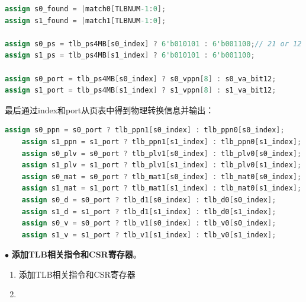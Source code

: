 \documentclass[11pt]{article}
\begin{document}
\begin{enumerate}
\begin{lstlisting}[language=verilog]
assign s0_found = |match0[TLBNUM-1:0];
assign s1_found = |match1[TLBNUM-1:0];

assign s0_ps = tlb_ps4MB[s0_index] ? 6'b010101 : 6'b001100;// 21 or 12 
assign s1_ps = tlb_ps4MB[s1_index] ? 6'b010101 : 6'b001100;

assign s0_port = tlb_ps4MB[s0_index] ? s0_vppn[8] : s0_va_bit12;
assign s1_port = tlb_ps4MB[s1_index] ? s1_vppn[8] : s1_va_bit12;

  \end{lstlisting}
  最后通过index和port从页表中得到物理转换信息并输出：
  \begin{lstlisting}[language=verilog]
    assign s0_ppn = s0_port ? tlb_ppn1[s0_index] : tlb_ppn0[s0_index];
    assign s1_ppn = s1_port ? tlb_ppn1[s1_index] : tlb_ppn0[s1_index];
    assign s0_plv = s0_port ? tlb_plv1[s0_index] : tlb_plv0[s0_index];
    assign s1_plv = s1_port ? tlb_plv1[s1_index] : tlb_plv0[s1_index];
    assign s0_mat = s0_port ? tlb_mat1[s0_index] : tlb_mat0[s0_index];
    assign s1_mat = s1_port ? tlb_mat1[s1_index] : tlb_mat0[s1_index];
    assign s0_d = s0_port ? tlb_d1[s0_index] : tlb_d0[s0_index];
    assign s1_d = s1_port ? tlb_d1[s1_index] : tlb_d0[s1_index];
    assign s0_v = s0_port ? tlb_v1[s0_index] : tlb_v0[s0_index];
    assign s1_v = s1_port ? tlb_v1[s1_index] : tlb_v0[s1_index];
      \end{lstlisting}
\end{enumerate}



\noindent
$\bullet$
\textbf{添加TLB相关指令和CSR寄存器}。
\vspace{1ex}
\begin{enumerate}
  \item 添加TLB相关指令和CSR寄存器

\item 
\end{enumerate}
\end{document}
